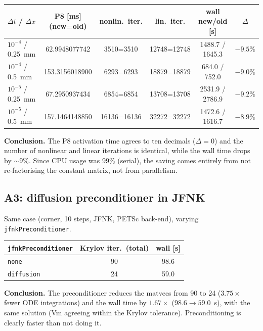 \documentclass[11pt,a4paper]{article}
\newcommand{\code}[1]{\texttt{\small #1}}
\newcommand{\dictkey}[1]{\textcolor{black!60!green}{\texttt{\footnotesize #1}}}
\begin{document}
\begin{center}
\begin{tabular}{@{}lccccc@{}}
\toprule
$\Delta t$ / $\Delta x$ & P8 [ms] (new=old) & nonlin.\ iter. & lin.\ iter. &
    wall new/old [s] & $\Delta$ \\
\midrule
$10^{-4}$ / \SI{0.25}{mm} & 62.9948077742 & 3510=3510 & 12748=12748 & 1488.7 / 1645.3 & $-9.5\%$ \\
$10^{-4}$ / \SI{0.5}{mm}  & 153.3156018900 & 6293=6293 & 18879=18879 & 684.0 / 752.0 & $-9.0\%$ \\
$10^{-5}$ / \SI{0.25}{mm} & 67.2950937434 & 6854=6854 & 13708=13708 & 2531.9 / 2786.9 & $-9.2\%$ \\
$10^{-5}$ / \SI{0.5}{mm}  & 157.1464148850 & 16136=16136 & 32272=32272 & 1472.6 / 1616.7 & $-8.9\%$ \\
\bottomrule
\end{tabular}
\end{center}

\noindent\textbf{Conclusion.} The P8 activation time agrees to ten
decimals ($\Delta=0$) and the number of nonlinear and linear iterations is
identical, while the wall time drops by $\sim 9\%$. Since CPU usage was
$99\%$ (serial), the saving comes entirely from not re-factorising the constant
matrix, not from parallelism.

\subsection{A3: diffusion preconditioner in JFNK}
\label{sec:exp-A3}

Same case (corner, 10 steps, JFNK, PETSc back-end), varying
\dictkey{jfnkPreconditioner}.

\begin{center}
\begin{tabular}{@{}lcc@{}}
\toprule
\dictkey{jfnkPreconditioner} & Krylov iter.\ (total) & wall [s] \\
\midrule
\code{none}      & 90 & 98.6 \\
\code{diffusion} & 24 & 59.0 \\
\bottomrule
\end{tabular}
\end{center}

\noindent\textbf{Conclusion.} The preconditioner reduces the matvecs from 90 to 24
($3.75\times$ fewer ODE integrations) and the wall time by $1.67\times$
($98.6\to59.0$~s), with the same solution (Vm agreeing within the Krylov
tolerance). Preconditioning is clearly faster than not doing it.
\end{document}

